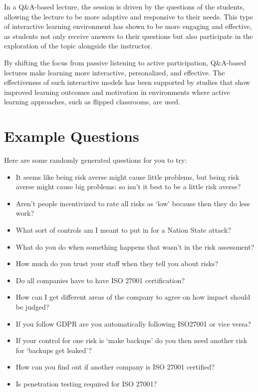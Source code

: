 \documentclass[12pt]{article}
\begin{document}
In a Q\&A-based lecture, the session is driven by the questions of the students, allowing the lecture to be more adaptive and responsive to their needs. This type of interactive learning environment has shown to be more engaging and effective, as students not only receive answers to their questions but also participate in the exploration of the topic alongside the instructor.\cite{ZhengLanqin2020TEot} 

By shifting the focus from passive listening to active participation, Q\&A-based lectures make learning more interactive, personalized, and effective. The effectiveness of such interactive models has been supported by studies that show improved learning outcomes and motivation in environments where active learning approaches, such as flipped classrooms, are used.\cite{ZhengLanqin2020TEot}

\section{Example Questions} 
Here are some randomly generated questions for you to try: 

\begin{itemize}
  \item It seems like being risk averse might cause little problems, but being risk averse might cause big problems: so isn't it best to be a little risk averse?
  \item Aren't people incentivized to rate all risks as `low' because then they do less work?
  \item What sort of controls am I meant to put in for a Nation State attack?
  \item What do you do when something happens that wasn't in the risk assessment?
  \item How much do you trust your staff when they tell you about risks?
  \item Do all companies have to have ISO 27001 certification?
  \item How can I get different areas of the company to agree on how impact should be judged?
  \item If you follow GDPR are you automatically following ISO27001 or vice versa?
  \item If your control for one risk is `make backups' do you then need another risk for `backups get leaked'?
  \item How can you find out if another company is ISO 27001 certified?
  \item Is penetration testing required for ISO 27001?
\end{itemize}
\end{document}
